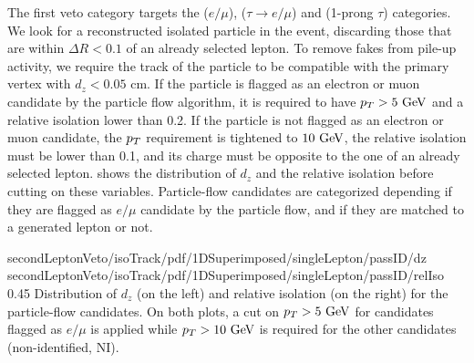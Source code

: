     The first veto category targets the ($e/\mu$), ($\tau \rightarrow e/\mu$)
    and (1-prong $\tau$) categories. We look for a reconstructed isolated
    particle in the event, discarding those that are within $\Delta R < 0.1$ of
    an already selected lepton. To remove fakes from pile-up activity, we
    require the track of the particle to be compatible with the primary vertex
    with $d_z < 0.05$ cm.  If the particle is flagged as an electron or muon
    candidate by the particle flow algorithm, it is required to have $p_T >
    5~\text{GeV}$ and a relative isolation lower than 0.2.  If the particle is not
    flagged as an electron or muon candidate, the $p_T$ requirement is tightened
    to $10~\text{GeV}$, the relative isolation must be lower than 0.1, and its charge
    must be opposite to the one of an already selected lepton.
     shows the distribution of $d_z$ and
    the relative isolation before cutting on these variables. Particle-flow
    candidates are categorized depending if they are flagged as $e/\mu$
    candidate by the particle flow, and if they are matched to a generated
    lepton or not.

                     {secondLeptonVeto/isoTrack/pdf/1DSuperimposed/singleLepton/passID/dz}
                     {secondLeptonVeto/isoTrack/pdf/1DSuperimposed/singleLepton/passID/relIso}
                     {0.45}
                     {Distribution of $d_z$ (on the left) and relative isolation
                     (on the right) for the particle-flow candidates. On both
                     plots, a cut on $p_T > 5~\text{GeV}$ for candidates flagged as
                     $e/\mu$ is applied while $p_T > 10~\text{GeV}$ is required for the
                     other candidates (non-identified, NI).}

